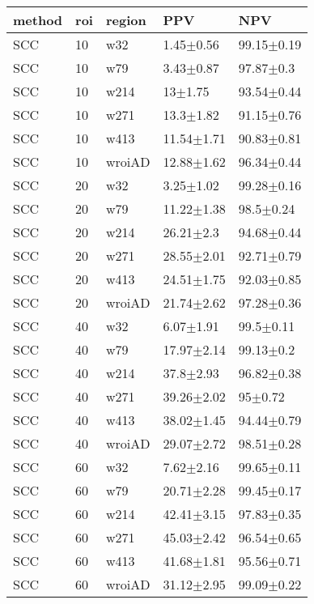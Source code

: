 \begin{table}[ht]
\begin{center}
\begin{tabular}{lllll}
  \hline
method & roi & region & PPV & NPV \\ 
  \hline
SCC & 10 & w32 & 1.45$\pm$0.56 & 99.15$\pm$0.19 \\ 
  SCC & 10 & w79 & 3.43$\pm$0.87 & 97.87$\pm$0.3 \\ 
  SCC & 10 & w214 & 13$\pm$1.75 & 93.54$\pm$0.44 \\ 
  SCC & 10 & w271 & 13.3$\pm$1.82 & 91.15$\pm$0.76 \\ 
  SCC & 10 & w413 & 11.54$\pm$1.71 & 90.83$\pm$0.81 \\ 
  SCC & 10 & wroiAD & 12.88$\pm$1.62 & 96.34$\pm$0.44 \\ 
  SCC & 20 & w32 & 3.25$\pm$1.02 & 99.28$\pm$0.16 \\ 
  SCC & 20 & w79 & 11.22$\pm$1.38 & 98.5$\pm$0.24 \\ 
  SCC & 20 & w214 & 26.21$\pm$2.3 & 94.68$\pm$0.44 \\ 
  SCC & 20 & w271 & 28.55$\pm$2.01 & 92.71$\pm$0.79 \\ 
  SCC & 20 & w413 & 24.51$\pm$1.75 & 92.03$\pm$0.85 \\ 
  SCC & 20 & wroiAD & 21.74$\pm$2.62 & 97.28$\pm$0.36 \\ 
  SCC & 40 & w32 & 6.07$\pm$1.91 & 99.5$\pm$0.11 \\ 
  SCC & 40 & w79 & 17.97$\pm$2.14 & 99.13$\pm$0.2 \\ 
  SCC & 40 & w214 & 37.8$\pm$2.93 & 96.82$\pm$0.38 \\ 
  SCC & 40 & w271 & 39.26$\pm$2.02 & 95$\pm$0.72 \\ 
  SCC & 40 & w413 & 38.02$\pm$1.45 & 94.44$\pm$0.79 \\ 
  SCC & 40 & wroiAD & 29.07$\pm$2.72 & 98.51$\pm$0.28 \\ 
  SCC & 60 & w32 & 7.62$\pm$2.16 & 99.65$\pm$0.11 \\ 
  SCC & 60 & w79 & 20.71$\pm$2.28 & 99.45$\pm$0.17 \\ 
  SCC & 60 & w214 & 42.41$\pm$3.15 & 97.83$\pm$0.35 \\ 
  SCC & 60 & w271 & 45.03$\pm$2.42 & 96.54$\pm$0.65 \\ 
  SCC & 60 & w413 & 41.68$\pm$1.81 & 95.56$\pm$0.71 \\ 
  SCC & 60 & wroiAD & 31.12$\pm$2.95 & 99.09$\pm$0.22 \\ 

\end{tabular}
\end{center}
\end{table}

